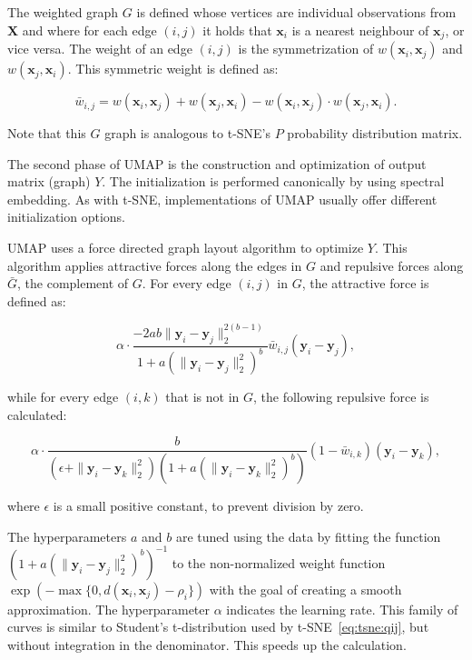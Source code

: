 The weighted graph $G$ is defined whose vertices are individual observations from $\mathbf{X}$ and where for each edge $(i, j)$ it holds that $\mathbf{x}_i$ is a nearest neighbour of $\mathbf{x}_j$, or vice versa. The weight of an edge $(i, j)$ is the symmetrization of $w(\mathbf{x}_i, \mathbf{x}_j)$ and $w(\mathbf{x}_j, \mathbf{x}_i)$. This symmetric weight is defined as:

\begin{equation}
	\bar{w}_{i,j} = w(\mathbf{x}_i,\mathbf{x}_j)+w(\mathbf{x}_j,\mathbf{x}_i)-w(\mathbf{x}_i,\mathbf{x}_j)\cdot w(\mathbf{x}_j,\mathbf{x}_i).
\end{equation}

Note that this $G$ graph is analogous to t-SNE's $P$ probability distribution matrix.

The second phase of UMAP is the construction and optimization of output matrix (graph) $Y$. The initialization is performed canonically by using spectral embedding. As with t-SNE, implementations of UMAP usually offer different initialization options.

UMAP uses a force directed graph layout algorithm to optimize $Y$. This algorithm applies attractive forces along the edges in $G$ and repulsive forces along $\bar{G}$, the complement of $G$. For every edge $(i, j)$ in $G$, the attractive force is defined as:

\begin{equation}
	\alpha\cdot
	\frac{-2ab\|\mathbf{y}_i-\mathbf{y}_j\|_2^{2(b-1)}}{1+a\left(\|\mathbf{y}_i-\mathbf{y}_j\|_2^{2}\right)^b}
	\bar{w}_{i,j}(\mathbf{y}_i-\mathbf{y}_j),
\end{equation}

while for every edge $(i, k)$  that is not in $G$, the following repulsive force is calculated:

\begin{equation}
	\alpha\cdot
	\frac{b}{\left(\epsilon+\|\mathbf{y}_i-\mathbf{y}_k\|_2^2\right)\left(1+a\left(\|\mathbf{y}_i-\mathbf{y}_k\|_2^{2}\right)^b\right)}
	\left(1- \bar{w}_{i,k}\right)(\mathbf{y}_i-\mathbf{y}_k),
\end{equation}

where $\epsilon$ is a small positive constant, to prevent division by zero.

The hyperparameters $a$ and $b$ are tuned using the data by fitting the function $\left(1+a\left(\|\mathbf{y}_i-\mathbf{y}_j\|_2^{2}\right)^b\right)^{-1}$ to the non-normalized weight function $\exp\left({-\max\{0,d(\mathbf{x}_i, \mathbf{x}_j)-\rho_i\}}\right)$ with the goal of creating a smooth approximation. The hyperparameter $\alpha$ indicates the learning rate. This family of curves is similar to Student's t-distribution used by t-SNE~\eqref{eq:tsne:qij}, but without integration in the denominator. This speeds up the calculation.

